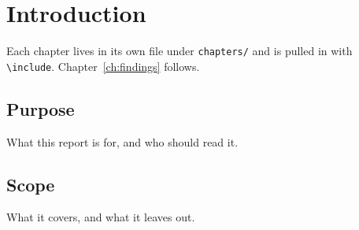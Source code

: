 \chapter{Introduction}
\label{ch:intro}
Each chapter lives in its own file under \texttt{chapters/} and is pulled in
with \texttt{\textbackslash include}. Chapter~\ref{ch:findings} follows.

\section{Purpose}
What this report is for, and who should read it.

\section{Scope}
What it covers, and what it leaves out.
